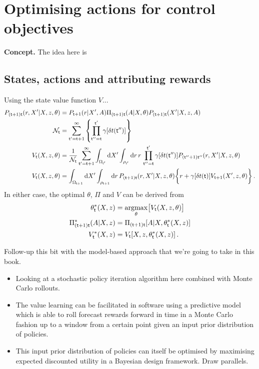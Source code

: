 \chapter{\sffamily Optimising actions for control objectives}

{\bfseries\sffamily Concept.} The idea here is 

\section{\sffamily States, actions and attributing rewards}    

Using the state value function $V$...
\begin{align}
P_{({\sf t}+1){\sf t}}(r,X'\vert X, z,\theta) &= P_{{\sf t}+1}(r\vert X',A)\Pi_{({\sf t}+1){\sf t}}(A\vert X,\theta)P_{({\sf t}+1){\sf t}}(X'\vert X,z,A)  \\
{\cal N}_{{\sf t}} &= \sum_{{\sf t}'={\sf t}+1}^{\infty}\left\{ \prod_{{\sf t}''={\sf t}}^{{\sf t}'} \gamma [\delta t({\sf t}'')] \right\} \\
V_{{\sf t}}(X,z,\theta) &= \frac{1}{{\cal N}_{{\sf t}}}\sum_{{\sf t}'={\sf t}+1}^{\infty} \int_{\Omega_{{\sf t}'}}{\rm d}X'\int_{\rho_{{\sf t}'}} {\rm d}r \,r\, \prod_{{\sf t}''={\sf t}}^{{\sf t}'} \gamma [\delta t({\sf t}'')]P_{({\sf t}''+1){\sf t}''}(r,X'\vert X, z,\theta) \\
V_{{\sf t}}(X,z,\theta) &= \int_{\Omega_{{\sf t}+1}}{\rm d}X'\int_{\rho_{{\sf t}+1}} {\rm d}r \, P_{({\sf t}+1){\sf t}}(r,X'\vert X, z,\theta)\bigg\{ r+\gamma [\delta t({\sf t})]V_{{\sf t}+1}(X',z,\theta)\bigg\} \,.
\end{align}
In either case, the optimal $\theta$, $\Pi$ and $V$ can be derived from
\begin{align}
\theta^*_{{\sf t}}(X,z) &= \underset{\theta}{{\rm argmax}} \big[ V_{{\sf t}}(X,z,\theta)\big] \\
\Pi^*_{({\sf t}+1){\sf t}}(A\vert X,z) &= \Pi_{({\sf t}+1){\sf t}}[A\vert X,\theta^*_{{\sf t}}(X,z)] \\
V^*_{{\sf t}}(X,z) &= V_{{\sf t}}[X,z,\theta^*_{{\sf t}}(X,z)] \,.
\end{align}

Follow-up this bit with the model-based approach that we're going to take in this book.
\begin{itemize}
\item{Looking at a stochastic policy iteration algorithm here combined with Monte Carlo rollouts.}
\item{The value learning can be facilitated in software using a predictive model which is able to roll forecast rewards forward in time in a Monte Carlo fashion up to a window from a certain point given an input prior distribution of policies.}
\item{This input prior distribution of policies can itself be optimised by maximising expected discounted utility in a Bayesian design framework. Draw parallels.}
\end{itemize}